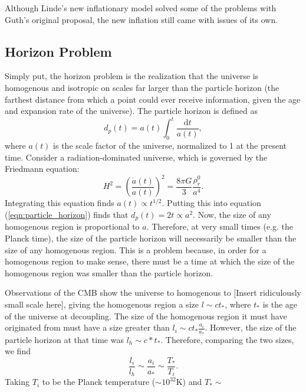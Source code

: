 \documentclass[onecolumn,apj]{emulateapj}
\def\d{\mathrm{d}}
\begin{document}
Although Linde's new inflationary model solved some of the problems with Guth's original proposal, the new inflation still came with issues of its own. 

\subsection{Horizon Problem}
\label{ssec:horizon}
Simply put, the horizon problem is the realization that the universe is homogenous and isotropic on scales far larger than the particle horizon (the farthest distance from which a point could ever receive information, given the age and expansion rate of the universe). The particle horizon is defined as 
\begin{equation}
d_p(t) = a(t) \int_0^t \frac{\d t}{a(t)},
\label{eqn:particle_horizon}
\end{equation}
where $a(t)$ is the scale factor of the universe, normalized to 1 at the present time. Consider a radiation-dominated universe, which is governed by the Friedmann equation:
\begin{equation}
H^2 = \left ( \frac{\dot a(t)}{a(t)} \right ) ^2 = \frac{8 \pi G}{3} \frac{\rho^0_r}{a^4}.
\end{equation}
Integrating this equation finds $a(t) \propto t^{1/2}$. Putting this into equation (\ref{eqn:particle_horizon}) finds that $d_p(t) = 2t \propto a^2$. Now, the size of any homogenous region is proportional to $a$. Therefore, at very small times (e.g. the Planck time), the size of the particle horizon will necessarily be smaller than the size of any homogenous region. This is a problem because, in order for a homogenous region to make sense, there must be a time at which the size of the homogenous region was smaller than the particle horizon. 

Observations of the CMB show the universe to homogenous to [Insert ridiculously small scale here], giving the homogenous region a size $l \sim c t_*$, where $t_*$ is the age of the universe at decoupling. The size of the homogenous region it must have originated from must have a size greater than $l_i \sim c t_* \tfrac{a_i}{a_*}$. However, the size of the particle horizon at that time was $l_h \sim c*t_*$. Therefore, comparing the two sizes, we find
\begin{equation}
\frac{l_i}{l_h} \sim \frac{a_i}{a_*} \sim \frac{T_*}{T_i}.
\end{equation}
 Taking $T_i$ to be the Planck temperature ($\sim 10^{32}$K) and $T_* \sim $
\end{document}
